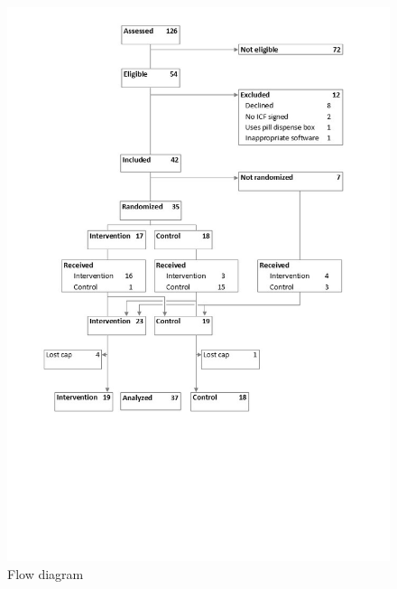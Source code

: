 \documentclass[twocolumn, serif, empirical, authordate]{jote-article}
\begin{document}
\begin{figure}[h!]
\label{fig:fig1}
\includegraphics[width=.5\linewidth]{media/media/image1.jpg}
\caption{Flow diagram}
\end{figure}
\end{document}
